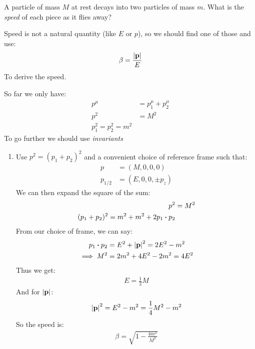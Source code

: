 \begin{example}
  A particle of mass $M$ at rest decays into two particles of mass $m$. What is the \emph{speed} of each piece as it flies away?

  Speed is not a natural quantity (like $E$ or $p$), so we should find one of those and use:
  \begin{align*}
    \beta=\frac{\abs{\vb{p}}}{E}
  \end{align*}
  To derive the speed.

  So far we only have:
  \begin{align*}
    p^\mu&=p_1^\mu+p_2^\mu\\
    p^2&=M^2\\
    p_1^2=p_2^2=m^2
  \end{align*}
  To go further we should use \emph{invariants}
  \begin{enumerate}[label=\alph*)]
  \item Use $p^2=(p_1+p_2)^2$ and a convenient choice of reference frame such that:
    \begin{align*}
      p&=(M,0,0,0)\\
      p_{1/2}&=(E,0,0,\pm p_z)
    \end{align*}
    We can then expand the square of the sum:
    \begin{align*}
      p^2&=M^2\\
      (p_1+p_2)^2=m^2+m^2+2p_1\vdot p_2
    \end{align*}
    From our choice of frame, we can say:
    \begin{align*}
      p_1\vdot p_2&=E^2+\abs{\vb{p}}^2=2E^2-m^2\\
      \implies M^2&=2m^2+4E^2-2m^2=4E^2
    \end{align*}
    Thus we get:
    \begin{align*}
      E=\frac12M
    \end{align*}
    And for $\abs{\vb{p}}$:
    \begin{align*}
      \abs{\vb{p}}^2=E^2-m^2=\frac14M^2-m^2
    \end{align*}
    So the speed is:
    \begin{align*}
      \boxed{\beta=\sqrt{1-\frac{4m^2}{M^2}}}
    \end{align*}
  \end{enumerate}
\end{example}

